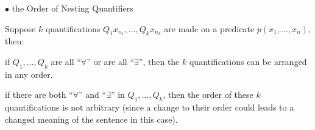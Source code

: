 \documentclass{article}
\begin{document}
\begin{Spec}{$\bullet$ the Order of Nesting Quantifiers}
    \textcolor{Tr}{Suppose $k$ quantifications $Q_1 x_{n_1}, \dots, Q_k x_{n_k}$ are made on a predicate $p(x_1, \dots, x_n)$, then:
    \begin{compactenum}
        \item if $Q_1, \dots, Q_k$ are all ``$\forall$'' or are all ``$\exists$'', then the $k$ quantifications can be arranged in any order.
        \item if there are both ``$\forall$'' and ``$\exists$'' in $Q_1, \dots, Q_k$, then the order of these $k$ quantifications is not arbitrary (since a change to their order could leads to a changed meaning of the sentence in this case).
    \end{compactenum}}
\end{Spec}
\end{document}
